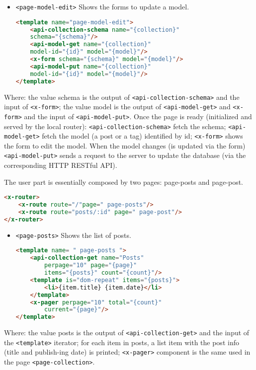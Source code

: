 \begin{itemize} \item \texttt{<page-model-edit>} Shows the forms to update a model.
\begin{lstlisting}[language=html]
<template name="page-model-edit">
	<api-collection-schema name="{collection}"
	schema="{schema}"/>
	<api-model-get name="{collection}"
	model-id="{id}" model="{model}"/>
	<x-form schema="{schema}" model="{model}"/>
	<api-model-put name="{collection}"
	model-id="{id}" model="{model}"/>
</template>
\end{lstlisting}
\end{itemize}

Where: the value schema is the output of \texttt{<api-collection-schema>} and the input of \texttt{<x-form>}; the value model is the output of \texttt{<api-model-get>} and \texttt{<x-form>} and the input of \texttt{<api-model-put>}. Once the page is ready (initialized and served by the local router): \texttt{<api-collection-schema>} fetch the schema; \texttt{<api-model-get>} fetch the model (a post or a tag) identified by id; \texttt{<x-form>} shows the form to edit the model. When the model changes (is updated via the form) \texttt{<api-model-put>} sends a request to the server to update the database (via the corresponding HTTP RESTful API).


The user part is essentially composed by two pages: page-posts and page-post.

\begin{lstlisting}[language=html]
<x-router>
	<x-route route="/"page=" page-posts"/>
	<x-route route="posts/:id" page=" page-post"/>
</x-router>
\end{lstlisting}

\begin{itemize} \item \texttt{<page-posts>} Shows the list of posts.
\begin{lstlisting}[language=html]
<template name= " page-posts ">
	<api-collection-get name="Posts"
		perpage="10" page="{page}"
		items="{posts}" count="{count}"/>
	<template is="dom-repeat" items="{posts}">
		<li>{item.title} {item.date}</li>
	</template>
	<x-pager perpage="10" total="{count}"
		current="{page}"/>
</template>
\end{lstlisting}
\end{itemize}

Where: the value posts is the output of \texttt{<api-collection-get>} and the input of the \texttt{<template>} iterator; for each item in posts, a list item with the post info (title and publish-ing date) is printed; \texttt{<x-pager>} component is the same used in the page \texttt{<page-collection>}.

